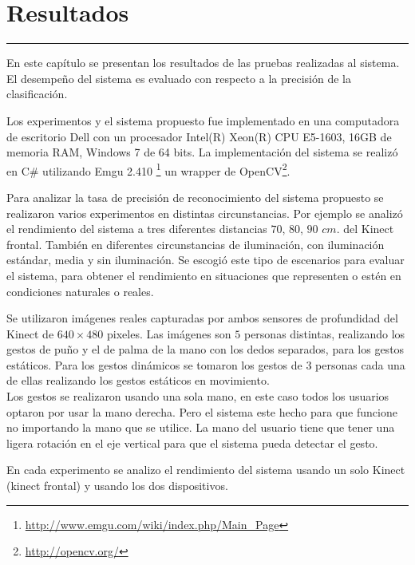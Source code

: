 \chapter{Resultados}\label{capit:cap5}
\vspace{-2.0325ex}%
\noindent
\rule{\textwidth}{0.5pt}
\vspace{-5.5ex}%
\newcommand{\pushline}{\Indp}%

En este capítulo se presentan los resultados de las pruebas realizadas al sistema. El desempeño del sistema es evaluado con respecto a la precisi\'on de la clasificación.   

Los experimentos y el sistema propuesto fue implementado en una computadora de escritorio Dell con un procesador Intel(R) Xeon(R) CPU E5-1603, 16GB de memoria RAM, Windows 7 de 64 bits. La implementación del sistema se realizó en C\# utilizando Emgu 2.410 \footnote{\url{http://www.emgu.com/wiki/index.php/Main\_Page}} un wrapper de OpenCV\footnote{\url{http://opencv.org/}}. 

Para analizar la tasa de precisión de reconocimiento del sistema propuesto se realizaron varios experimentos en distintas circunstancias. Por ejemplo se analizó el rendimiento del sistema a tres diferentes distancias $70$, $80$, $90$ $cm.$ del Kinect frontal. También en diferentes circunstancias de iluminación, con iluminación estándar, media y sin iluminación. Se escogió este tipo de escenarios para evaluar el sistema, para obtener el rendimiento en situaciones que representen o estén en condiciones naturales o reales.

Se utilizaron imágenes reales capturadas por ambos sensores de profundidad del Kinect de $640 \times 480$ pixeles. Las imágenes son $5$ personas distintas, realizando los gestos de puño y el de palma de la mano con los dedos separados, para los gestos estáticos. Para los gestos dinámicos se tomaron los gestos de $3$ personas cada una de ellas realizando los gestos estáticos en movimiento.\\
Los gestos se realizaron usando una sola mano, en este caso todos los usuarios optaron por usar la mano derecha. Pero el sistema este hecho para que funcione no importando la mano que se utilice. La mano del usuario tiene que tener una ligera rotación en el eje vertical para que el sistema pueda detectar el gesto.

En cada experimento se analizo el rendimiento del sistema usando un solo Kinect (kinect frontal) y usando los dos dispositivos.  


